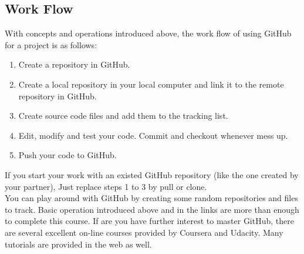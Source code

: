 \documentclass[12pt, fullpage,letterpaper]{article}
\begin{document}
\subsection*{Work Flow}
With concepts and operations introduced above, the work flow of using GitHub for a project is as follows:
\begin{enumerate}
	\item Create a repository in GitHub.
	\item Create a local repository in your local computer and link it to the remote repository in GitHub.
	\item Create source code files and add them to the tracking list.
	\item Edit, modify and test your code. Commit and checkout whenever mess up.
	\item Push your code to GitHub.
\end{enumerate}

If you start your work with an existed GitHub repository (like  the one created by your partner), Just replace steps 1 to 3 by pull or clone. \\

You can play around with GitHub by creating some random  repositories and files to track. 
Basic operation introduced above and in the links are more than enough to complete this course. If are you have further interest to master GitHub, there are several excellent on-line courses provided by Coursera and Udacity. Many tutorials are provided in the web as well. 
\end{document}
